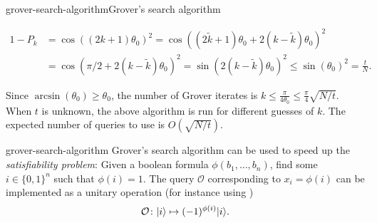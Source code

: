 \begin{topic}{grover-search-algorithm}{Grover's search algorithm}
\begin{enumerate}[label=(\arabic*)]
\[\begin{aligned}
            1 - P_k
                &= \cos((2k + 1) \theta_0)^2 = \cos((2 \tilde{k} + 1) \theta_0 + 2 (k - \tilde{k}) \theta_0)^2 \\
                &= \cos(\pi/2 + 2 (k - \tilde{k}) \theta_0)^2 = \sin(2(k - \tilde{k}) \theta_0)^2 \le \sin(\theta_0)^2 = \frac{t}{N} .
        \end{aligned} \]
    \end{enumerate}
    Since $\arcsin(\theta_0) \ge \theta_0$, the number of Grover iterates is $k \le \tfrac{\pi}{4 \theta_0} \le \tfrac{\pi}{4} \sqrt{N/t}$. When $t$ is unknown, the above algorithm is run for different guesses of $k$. The expected number of queries to use is $O(\sqrt{N / t})$.
\end{topic}

\begin{example}{grover-search-algorithm}
    Grover's search algorithm can be used to speed up the \textit{satisfiability problem}: Given a boolean formula $\phi(b_1, \ldots, b_n)$, find some $i \in \{ 0, 1\}^n$ such that $\phi(i) = 1$. The query $\mathcal{O}$ corresponding to $x_i = \phi(i)$ can be implemented as a unitary operation (for instance using )
    \[ \mathcal{O} \colon |i\rangle \mapsto (-1)^{\phi(i)} |i\rangle . \]
\end{example}

